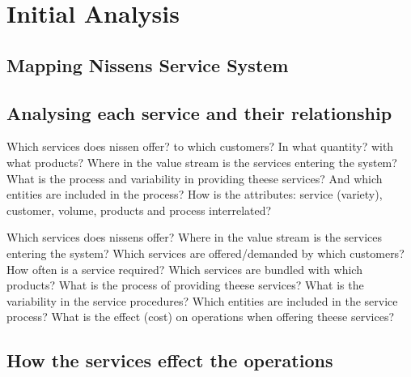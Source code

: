 \chapter{Initial Analysis}\label{ch:initial_analysis}


\section{Mapping Nissens Service System}



\section{Analysing each service and their relationship}
    
    Which services does nissen offer? to which customers? In what quantity? with what products?
    Where in the value stream is the services entering the system?
    What is the process and variability in providing theese services? And which entities are included in the process?
    How is the attributes: service (variety), customer, volume, products and process interrelated?
  
    Which services does nissens offer?
    Where in the value stream is the services entering the system?
    Which services are offered/demanded by which customers?
    How often is a service required? 
    Which services are bundled with which products?
    What is the process of providing theese services?
    What is the variability in the service procedures?
    Which entities are included in the service process?
    What is the effect (cost) on operations when offering theese services?



\section{How the services effect the operations}